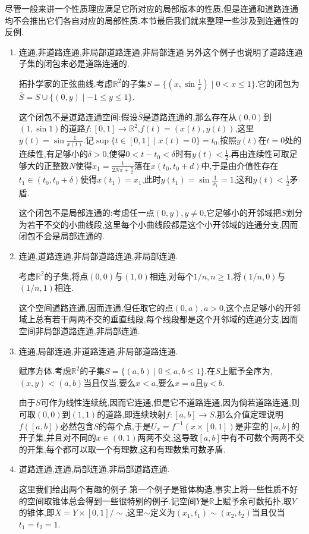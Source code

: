 尽管一般来讲一个性质理应满足它所对应的局部版本的性质,但是连通和道路连通均不会推出它们各自对应的局部性质.本节最后我们就来整理一些涉及到连通性的反例.
\begin{enumerate}
	\item 连通,非道路连通,非局部道路连通,非局部连通.另外这个例子也说明了道路连通子集的闭包未必是道路连通的.
	
	拓扑学家的正弦曲线.考虑$\mathbb{R}^2$的子集$S=\{(x,\sin\frac{1}{x})\mid 0<x\le1\}$.它的闭包为$\overline{S}=S\cup\{(0,y)\mid -1\le y\le1\}$.
	
	这个闭包不是道路连通空间:假设$\overline{S}$是道路连通的,那么存在从$(0,0)$到$(1,\sin1)$的道路$f:[0,1]\to\mathbb{R}^2$,$f(t)=(x(t),y(t))$,这里$y(t)=\sin\frac{1}{x(t)}$.记$\sup\{t\in[0,1]\mid x(t)=0\}=t_0$,按照$y(t)$在$t=0$处的连续性,有足够小的$\delta>0$,使得$0<t-t_0<\delta$时有$y(t)<\frac{1}{2}$.再由连续性可取足够大的正整数$N$使得$x_1=\frac{1}{2N\pi+\frac{\pi}{2}}$落在$x(t_0,t_0+d)$中,于是由介值性存在$t_1\in(t_0,t_0+\delta)$使得$x(t_1)=x_1$,此时$y(t_1)=\sin\frac{1}{x_1}=1$,这和$y(t)<\frac{1}{2}$矛盾.
	
	这个闭包不是局部连通的:考虑任一点$(0,y),y\not=0$,它足够小的开邻域把$\overline{S}$划分为若干不交的小曲线段,这里每个小曲线段都是这个小开邻域的连通分支,因而闭包不会是局部连通的.
	\item 连通,道路连通,非局部道路连通,非局部连通.
	
	考虑$\mathbb{R}^2$的子集,将点$(0,0)$与$(1,0)$相连,对每个$1/n,n\ge1$,将$(1/n,0)$与$(1/n,1)$相连.
	
	这个空间道路连通,因而连通,但任取它的点$(0,a),a>0$,这个点足够小的开邻域上总有若干两两不交的垂直线段,每个线段都是这个开邻域的连通分支,因而空间非局部道路连通,非局部连通.
	\item 连通,局部连通,非道路连通,非局部道路连通.
	
	赋序方体.考虑$\mathbb{R}^2$的子集$S=\{(a,b)\mid 0\le a,b\le1\}$.在$S$上赋予全序为,$(x,y)<(a,b)$当且仅当,要么$x<a$,要么$x=a$且$y<b$.
	
	由于$S$可作为线性连续统,因而它连通,但是它不道路连通,因为倘若道路连通,则可取$(0,0)$到$(1,1)$的道路,即连续映射$f:[a,b]\to S$.那么介值定理说明$f([a,b])$必然包含$S$的每个点,于是$U_x=f^{-1}(x\times[0,1])$是非空的$[a,b]$的开子集,并且对不同的$x\in(0,1)$两两不交,这导致$[a,b]$中有不可数个两两不交的开集,每个都可以取一个有理数,这和有理数集可数矛盾.
	\item 道路连通,连通,局部连通,非局部道路连通.
	
	这里我们给出两个有趣的例子.第一个例子是锥体构造,事实上将一些性质不好的空间取锥体总会得到一些很特别的例子.记空间$Y$是$\mathbb{R}$上赋予余可数拓扑,取$Y$的锥体,即$X=Y\times[0,1]/\sim$,这里$\sim$定义为$(x_1,t_1)\sim(x_2,t_2)$当且仅当$t_1=t_2=1$.
	

\end{enumerate}
